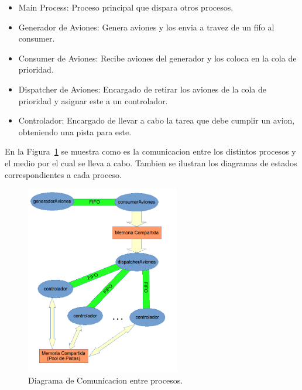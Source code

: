 \documentclass[a4paper,12pt,titlepage]{article}
\begin{document}
\begin{itemize}
\item Main Process: Proceso principal que dispara otros procesos.
\item Generador de Aviones: Genera aviones y los envia a travez de un fifo al consumer.
\item Consumer de Aviones: Recibe aviones del generador y los coloca en la cola de prioridad.
\item Dispatcher de Aviones: Encargado de retirar los aviones de la cola de prioridad y asignar este a un controlador.
\item Controlador: Encargado de llevar a cabo la tarea que debe cumplir un avion, obteniendo una pista para este.
\end{itemize}


En la Figura~\ref{fig:dia_comunicacion_procesos} se muestra como es la comunicacion entre los distintos procesos y el medio por el cual se lleva a cabo. Tambien se ilustran los diagramas de estados correspondientes a cada proceso.

\begin{figure}
  \centering
    \includegraphics[width=0.6\textwidth] {comunicacion_procesos}
  \caption{Diagrama de Comunicacion entre procesos.}
  \label{fig:dia_comunicacion_procesos}
\end{figure}



\end{document}
